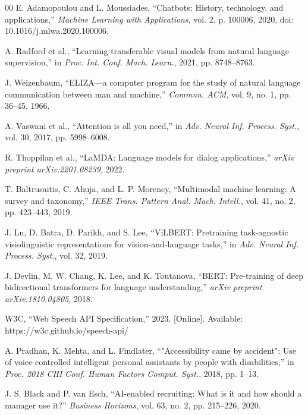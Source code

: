 \documentclass[conference]{IEEEtran}
\begin{document}
\begin{thebibliography}{00}
 E. Adamopoulou and L. Moussiades, ``Chatbots: History, technology, and applications,'' \textit{Machine Learning with Applications}, vol. 2, p. 100006, 2020, doi: 10.1016/j.mlwa.2020.100006.

 A. Radford et al., ``Learning transferable visual models from natural language supervision,'' in \textit{Proc. Int. Conf. Mach. Learn.}, 2021, pp. 8748--8763.

 J. Weizenbaum, ``ELIZA---a computer program for the study of natural language communication between man and machine,'' \textit{Commun. ACM}, vol. 9, no. 1, pp. 36--45, 1966.

 A. Vaswani et al., ``Attention is all you need,'' in \textit{Adv. Neural Inf. Process. Syst.}, vol. 30, 2017, pp. 5998--6008.

 R. Thoppilan et al., ``LaMDA: Language models for dialog applications,'' \textit{arXiv preprint arXiv:2201.08239}, 2022.

 T. Baltrusaitis, C. Ahuja, and L. P. Morency, ``Multimodal machine learning: A survey and taxonomy,'' \textit{IEEE Trans. Pattern Anal. Mach. Intell.}, vol. 41, no. 2, pp. 423--443, 2019.

 J. Lu, D. Batra, D. Parikh, and S. Lee, ``ViLBERT: Pretraining task-agnostic visiolinguistic representations for vision-and-language tasks,'' in \textit{Adv. Neural Inf. Process. Syst.}, vol. 32, 2019.

 J. Devlin, M. W. Chang, K. Lee, and K. Toutanova, ``BERT: Pre-training of deep bidirectional transformers for language understanding,'' \textit{arXiv preprint arXiv:1810.04805}, 2018.

 W3C, ``Web Speech API Specification,'' 2023. [Online]. Available: https://w3c.github.io/speech-api/

 A. Pradhan, K. Mehta, and L. Findlater, ``"Accessibility came by accident": Use of voice-controlled intelligent personal assistants by people with disabilities,'' in \textit{Proc. 2018 CHI Conf. Human Factors Comput. Syst.}, 2018, pp. 1--13.

 J. S. Black and P. van Esch, ``AI-enabled recruiting: What is it and how should a manager use it?'' \textit{Business Horizons}, vol. 63, no. 2, pp. 215--226, 2020.


\end{thebibliography}
\end{document}
